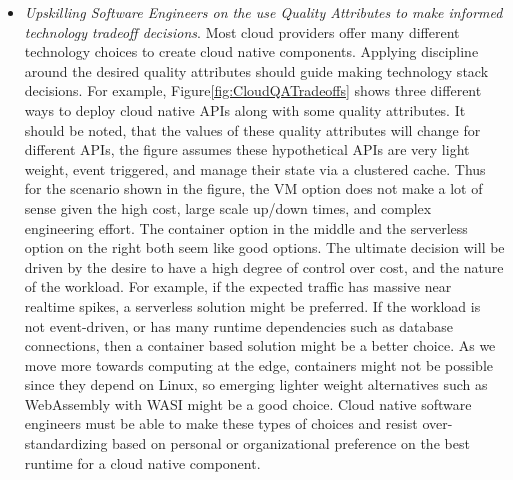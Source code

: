 \documentclass[conference]{IEEEconf}
\begin{document}
\begin{itemize}
	\item \textit{Upskilling Software Engineers on the use Quality Attributes to make informed technology tradeoff decisions}. Most cloud providers offer many different technology choices to create cloud native components.  Applying discipline around the desired quality attributes should guide making technology stack decisions. For example, Figure\ref{fig:CloudQATradeoffs} shows three different ways to deploy cloud native APIs along with some quality attributes.  It should be noted, that the values of these quality attributes will change for different APIs, the figure assumes these hypothetical APIs are very light weight, event triggered, and manage their state via a clustered cache.  Thus for the scenario shown in the figure, the VM option does not make a lot of sense given the high cost, large scale up/down times, and complex engineering effort.  The container option in the middle and the serverless option on the right both seem like good options.  The ultimate decision will be driven by the desire to have a high degree of control over cost, and the nature of the workload. For example, if the expected traffic has massive near realtime spikes, a serverless solution might be preferred. If the workload is not event-driven, or has many runtime dependencies such as database connections, then a container based solution might be a better choice. As we move more towards computing at the edge, containers might not be possible since they depend on Linux, so emerging lighter weight alternatives such as WebAssembly with WASI\cite{WASI} might be a good choice.  Cloud native software engineers must be able to make these types of choices and resist over-standardizing based on personal or organizational preference on the best runtime for a cloud native component.    
	

\end{itemize}
\end{document}
